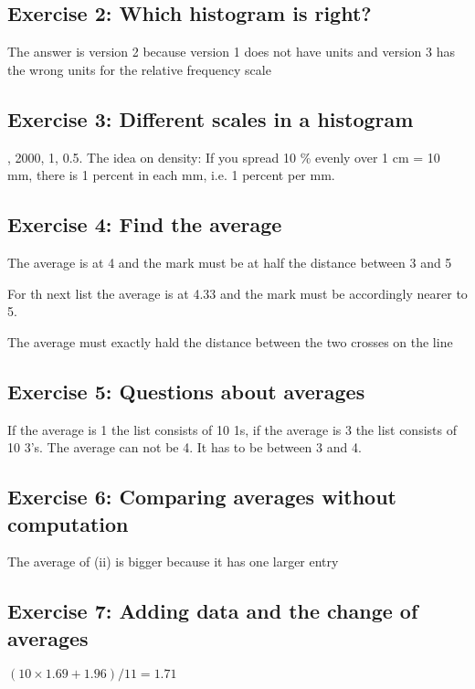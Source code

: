 \documentclass[letterpaper,10pt,english]{jupyterBook}
\begin{document}
\subsection{Exercise 2: Which histogram is right?}
\label{\detokenize{exercises_unit_2:exercise-2-which-histogram-is-right}}
\sphinxAtStartPar
The answer is version 2 because version 1 does not have units and version 3 has the wrong units for the relative frequency scale


\subsection{Exercise 3: Different scales in a histogram}
\label{\detokenize{exercises_unit_2:exercise-3-different-scales-in-a-histogram}}
, 2000, 1, 0.5. The idea on density: If you spread 10 \% evenly over 1 cm = 10 mm, there is 1 percent in each mm, i.e. 1 percent per mm.


\subsection{Exercise 4: Find the average}
\label{\detokenize{exercises_unit_2:exercise-4-find-the-average}}
\sphinxAtStartPar
The average is at 4 and the mark must be at half the distance between 3 and 5

\sphinxAtStartPar
For th next list the average is at 4.33 and the mark must be accordingly nearer to 5.

\sphinxAtStartPar
The average must exactly hald the distance between the two crosses on the line


\subsection{Exercise 5: Questions about averages}
\label{\detokenize{exercises_unit_2:exercise-5-questions-about-averages}}
\sphinxAtStartPar
If the average is 1 the list consists of 10 1s, if the average is 3 the list consists of 10 3’s. The average can not be 4. It has to be between 3 and 4.


\subsection{Exercise 6: Comparing averages without computation}
\label{\detokenize{exercises_unit_2:exercise-6-comparing-averages-without-computation}}
\sphinxAtStartPar
The average of (ii) is bigger because it has one larger entry


\subsection{Exercise 7: Adding data and the change of averages}
\label{\detokenize{exercises_unit_2:exercise-7-adding-data-and-the-change-of-averages}}
\sphinxAtStartPar
\((10 \times 1.69 + 1.96)/11 = 1.71\)
\end{document}
